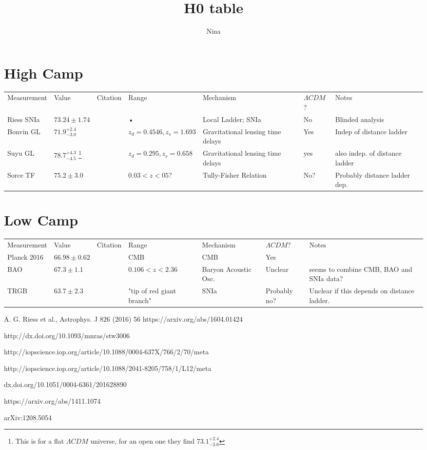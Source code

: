 \documentclass[10pt,a4paper]{article}
\author{Nina}
\title{H0 table}
\begin{document}
\begin{center}
\section*{High Camp}
\begin{tabular}{|l|l|l|l|l|l|l|}
Measurement & Value & Citation & Range & Mechanism &  $\Lambda CDM$? & Notes\\ 
Riess SNIa & $73.24 \pm 1.74$ & \cite{Riess16}& • & Local Ladder; SNIa & No & Blinded analysis\\ 
Bonvin GL & $71.9^{+2.4}_{-3.0}$ & \cite{BonvinGL} & $z_d = 0.4546,z_s=1.693$ & Gravitational lensing time delays & Yes & Indep of distance ladder \\ 
Suyu GL & $78.7^{+4.3}_{-4.5}$ \footnote{This is for a flat $\Lambda CDM$ universe, for an open one they find $73.1^{+2.4}_{-3.6}$} & \cite{SuyuGL} & $z_d=0.295,z_s=0.658$ & Gravitational lensing time delays & yes & also indep. of distance ladder \\
Sorce TF & $75.2 \pm 3.0$ &\cite{SorceTF} &$0.03<z<05$?& Tully-Fisher Relation & No? & Probably distance ladder dep.

\end{tabular}


\section*{Low Camp}
\begin{tabular}{|l|l|l|l|l|l|l|}
Measurement & Value & Citation & Range & Mechanism &  $\Lambda CDM$? & Notes\\
Planck 2016 &$66.98\pm 0.62$ & \cite{Planck16} & CMB & CMB & Yes & \\
BAO & $67.3 \pm 1.1$ & \cite{BAO} & $0.106<z<2.36$ & Baryon Acoustic Osc. & Unclear & seems to combine CMB, BAO and SNIa data? \\
TRGB &  $63.7 \pm 2.3$ & \cite{TRGB}& "tip of red giant branch" & SNIa &Probably no? & Unclear if this depends on distance ladder.  
\end{tabular}
\end{center}
\begin{thebibliography}{10}
 A. G. Riess et al., Astrophys. J 826 (2016) 56 https://arxiv.org/abs/1604.01424

 http://dx.doi.org/10.1093/mnras/stw3006

 http://iopscience.iop.org/article/10.1088/0004-637X/766/2/70/meta

http://iopscience.iop.org/article/10.1088/2041-8205/758/1/L12/meta

dx.doi.org/10.1051/0004-6361/201628890

https://arxiv.org/abs/1411.1074

 	arXiv:1208.5054
\end{thebibliography}
\end{document}
